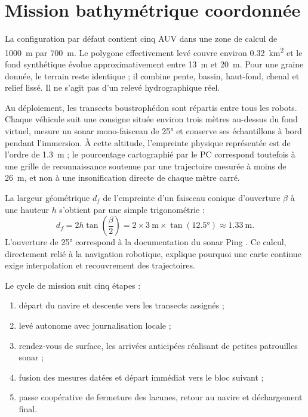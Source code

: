 \section{Mission bathymétrique coordonnée}

La configuration par défaut contient cinq AUV dans une zone de calcul de \SI{1000}{\metre} par \SI{700}{\metre}. Le polygone effectivement levé couvre environ \SI{0.32}{\square\kilo\metre} et le fond synthétique évolue approximativement entre \SI{13}{\metre} et \SI{20}{\metre}. Pour une graine donnée, le terrain reste identique ; il combine pente, bassin, haut-fond, chenal et relief lissé. Il ne s'agit pas d'un relevé hydrographique réel.

Au déploiement, les transects boustrophédon sont répartis entre tous les robots. Chaque véhicule suit une consigne située environ trois mètres au-dessus du fond virtuel, mesure un sonar mono-faisceau de \ang{25} et conserve ses échantillons à bord pendant l'immersion. À cette altitude, l'empreinte physique représentée est de l'ordre de \SI{1.3}{\metre} ; le pourcentage cartographié par le PC correspond toutefois à une grille de reconnaissance soutenue par une trajectoire mesurée à moins de \SI{26}{\metre}, et non à une insonification directe de chaque mètre carré.

La largeur géométrique $d_f$ de l'empreinte d'un faisceau conique d'ouverture $\beta$ à une hauteur $h$ s'obtient par une simple trigonométrie :
\begin{equation}
  d_f = 2h\tan\left(\frac{\beta}{2}\right)
  = 2\times\SI{3}{\metre}\times\tan(\ang{12.5})
  \approx \SI{1.33}{\metre}.
  \label{eq:sonar-footprint}
\end{equation}
L'ouverture de \ang{25} correspond à la documentation du sonar Ping \cite{bluerobotics-ping}. Ce calcul, directement relié à la navigation robotique, explique pourquoi une carte continue exige interpolation et recouvrement des trajectoires.

Le cycle de mission suit cinq étapes :

\begin{enumerate}
  \item départ du navire et descente vers les transects assignés ;
  \item levé autonome avec journalisation locale ;
  \item rendez-vous de surface, les arrivées anticipées réalisant de petites patrouilles sonar ;
  \item fusion des mesures datées et départ immédiat vers le bloc suivant ;
  \item passe coopérative de fermeture des lacunes, retour au navire et déchargement final.
\end{enumerate}

